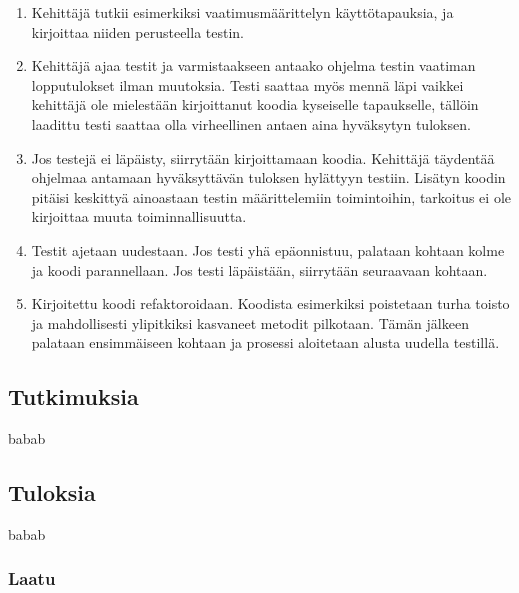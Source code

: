 \documentclass[finnish]{tktltiki2}
\theoremstyle{definition}
\theoremstyle{remark}
\begin{document}
\begin{enumerate}
  \item Kehittäjä tutkii esimerkiksi vaatimusmäärittelyn käyttötapauksia, ja kirjoittaa niiden perusteella testin.

  \item Kehittäjä ajaa testit ja varmistaakseen antaako ohjelma testin vaatiman lopputulokset ilman muutoksia. Testi saattaa myös mennä läpi vaikkei kehittäjä ole mielestään kirjoittanut koodia kyseiselle tapaukselle, tällöin laadittu testi saattaa olla virheellinen antaen aina hyväksytyn tuloksen.

  \item Jos testejä ei läpäisty, siirrytään kirjoittamaan koodia. Kehittäjä täydentää ohjelmaa antamaan hyväksyttävän tuloksen hylättyyn testiin. Lisätyn koodin pitäisi keskittyä ainoastaan testin määrittelemiin toimintoihin, tarkoitus ei ole kirjoittaa muuta toiminnallisuutta.

 \item Testit ajetaan uudestaan. Jos testi yhä epäonnistuu, palataan kohtaan kolme ja koodi parannellaan. Jos testi läpäistään, siirrytään seuraavaan kohtaan.

 \item Kirjoitettu koodi refaktoroidaan. Koodista esimerkiksi poistetaan turha toisto ja mahdollisesti ylipitkiksi kasvaneet metodit pilkotaan. Tämän jälkeen palataan ensimmäiseen kohtaan ja prosessi aloitetaan alusta uudella testillä.




\end{enumerate}




\subsection{Tutkimuksia}

babab




\subsection{Tuloksia}

babab

\subsubsection{Laatu}
\end{document}
